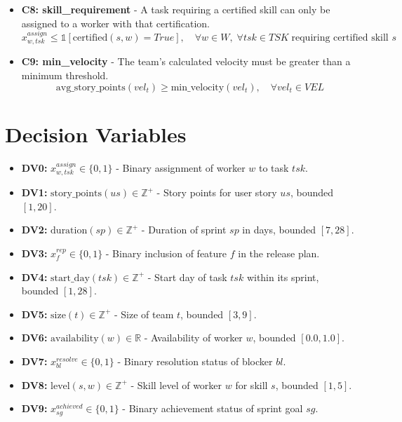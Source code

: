 \documentclass[11pt]{article}
\begin{document}
\begin{itemize}
    \item \textbf{C8: skill\_requirement} - A task requiring a certified skill can only be assigned to a worker with that certification.
        \[ x^{assign}_{w, tsk} \leq \mathbb{1}[\text{certified}(s, w) = True], \quad \forall w \in W, \; \forall tsk \in TSK \; \text{requiring certified skill } s \]

    \item \textbf{C9: min\_velocity} - The team's calculated velocity must be greater than a minimum threshold.
        \[ \text{avg\_story\_points}(vel_t) \geq \text{min\_velocity}(vel_t), \quad \forall vel_t \in VEL \]
\end{itemize}

\section{Decision Variables}
\begin{itemize}
    \item \textbf{DV0:} $x^{assign}_{w, tsk} \in \{0, 1\}$ - Binary assignment of worker $w$ to task $tsk$.
    \item \textbf{DV1:} $\text{story\_points}(us) \in \mathbb{Z}^+$ - Story points for user story $us$, bounded $[1, 20]$.
    \item \textbf{DV2:} $\text{duration}(sp) \in \mathbb{Z}^+$ - Duration of sprint $sp$ in days, bounded $[7, 28]$.
    \item \textbf{DV3:} $x^{rep}_f \in \{0, 1\}$ - Binary inclusion of feature $f$ in the release plan.
    \item \textbf{DV4:} $\text{start\_day}(tsk) \in \mathbb{Z}^+$ - Start day of task $tsk$ within its sprint, bounded $[1, 28]$.
    \item \textbf{DV5:} $\text{size}(t) \in \mathbb{Z}^+$ - Size of team $t$, bounded $[3, 9]$.
    \item \textbf{DV6:} $\text{availability}(w) \in \mathbb{R}$ - Availability of worker $w$, bounded $[0.0, 1.0]$.
    \item \textbf{DV7:} $x^{resolve}_{bl} \in \{0, 1\}$ - Binary resolution status of blocker $bl$.
    \item \textbf{DV8:} $\text{level}(s, w) \in \mathbb{Z}^+$ - Skill level of worker $w$ for skill $s$, bounded $[1, 5]$.
    \item \textbf{DV9:} $x^{achieved}_{sg} \in \{0, 1\}$ - Binary achievement status of sprint goal $sg$.
\end{itemize}
\end{document}
